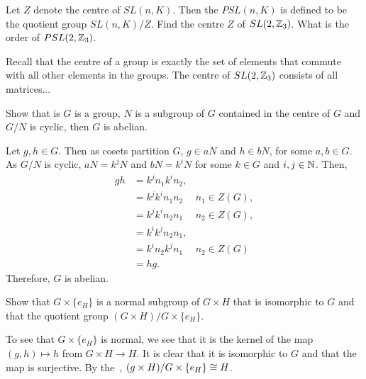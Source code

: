 \begin{questions}
  \begin{question}
    Let \(Z\) denote the centre of \(SL(n, K)\). Then the  \(PSL(n, K)\) is defined to be the quotient group \(SL(n, K) / Z\). Find the centre \(Z\) of \(SL(2, \mathbb{Z}_{3})\). What is the order of \(PSL(2, \mathbb{Z}_{3})\).
  \end{question}

  \begin{solution}
    Recall that the centre of a group is exactly the set of elements that commute with all other elements in the groups. The centre of \(SL(2, \mathbb{Z}_{3})\) consists of all matrices... %
  \end{solution}

  \begin{question}
    Show that is \(G\) is a group, \(N\) is a subgroup of \(G\) contained in the centre of \(G\) and \(G/N\) is cyclic, then \(G\) is abelian.
  \end{question}

  \begin{solution}
    Let \(g, h \in G\). Then as cosets partition \(G\), \(g \in aN\) and \(h \in bN\), for some \(a,b \in G\). As \(G/N\) is cyclic, \(aN = k^{j}N\) and \(bN = k^{i}N\) for some \(k \in G\) and \(i,j \in \mathbb{N}\). Then,
    \begin{align*}
      gh &= k^{j}n_{1} k^{i}n_{2}, \\
         &= k^{j} k^{i}n_{1} n_{2} & n_{1} \in Z(G), \\
         &= k^{j} k^{i}n_{2} n_{1} & n_{2} \in Z(G), \\
         &= k^{i} k^{j}n_{2} n_{1}, \\
         &= k^{i} n_{2} k^{j} n_{1} & n_{2} \in Z(G) \\
         &= hg.
    \end{align*}
    Therefore, \(G\) is abelian.
  \end{solution}

  \begin{question}
    Show that \(G \times \{e_{H}\}\) is a normal subgroup of \(G \times H\) that is isomorphic to \(G\) and that the quotient group \((G \times H)/G \times \{e_{H}\}\).
  \end{question}

  \begin{solution}
    To see that \(G \times \{e_{H}\}\) is normal, we see that it is the kernel of the map \((g,h) \mapsto h\) from \(G \times H \to H\). It is clear that it is isomorphic to \(G\) and that the map is surjective. By the~, \((g \times H) / G \times \{e_{H}\} \cong H\).
  \end{solution}
\end{questions}

